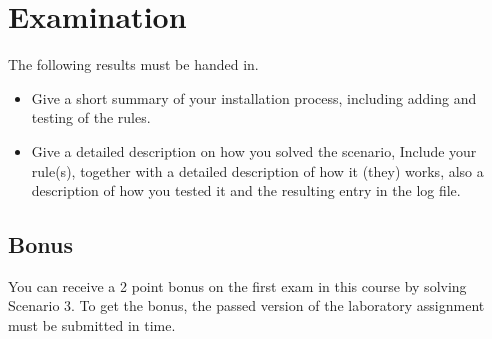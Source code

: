 \documentclass[a4paper,nocourse]{miunasgn}
\begin{document}
\section{Examination}
\label{sec:examination}
The following results must be handed in.
\begin{itemize}
    \item Give a short summary of your installation process, including adding
      and testing of the rules.

    \item Give a detailed description on how you solved the scenario, Include
      your rule(s), together with a detailed description of how it (they)
      works, also a description of how you tested it and the resulting entry in the
      log file.
\end{itemize}

\subsection{Bonus}
  You can receive a 2 point bonus on the first exam in this course by
  solving Scenario 3. To get the bonus, the passed version of the 
  laboratory assignment must be submitted in time.


\end{document}
